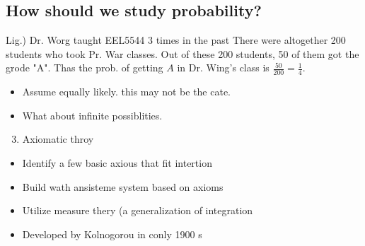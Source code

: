 \subsection{How should we study probability?}

Lig.) Dr. Worg taught EEL5544 3 times in the past There were altogether 200 students who took Pr. War classes. Out of these 200 students, 50 of them got the grode "A". Thas the prob. of getting \(A\) in Dr. Wing's class is \(\frac{50}{200}=\frac{1}{4}\).

\begin{itemize}
  \item[-] Assume equally likely. this may not be the cate.
  \item[-] What about infinite possiblities.
\end{itemize}

\begin{enumerate}
  \setcounter{enumi}{2}
  \item Axiomatic throy
\end{enumerate}

\begin{itemize}
  \item[-] Identify a few basic axious that fit intertion
  \item[-] Build wath ansisteme system based on axioms
  \item[-] Utilize measure thery (a generalization of integration
  \item[-] Developed by Kolnogorou in conly 1900 s
\end{itemize}

